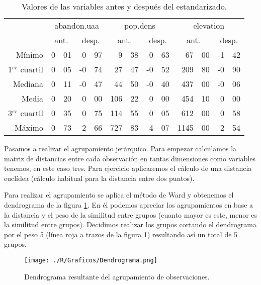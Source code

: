 \documentclass[11pt,a4paper]{article}
\begin{document}
\begin{table}[ht]
\centering
\begin{tabular}{rr@{,}lr@{,}lr@{,}lr@{,}lr@{,}lr@{,}l}
\toprule[0,4mm]
& \multicolumn{4}{c}{abandon.uaa} & \multicolumn{4}{c}{pop.dens} & \multicolumn{4}{c}{elevation}\\
& \multicolumn{2}{c}{ant.} & \multicolumn{2}{c}{desp.} & \multicolumn{2}{c}{ant.} & \multicolumn{2}{c}{desp.} & \multicolumn{2}{c}{ant.} & \multicolumn{2}{c}{desp.}\\
\midrule
Mínimo & 0&01 & -0&97 & 9&38 & -0&63 & 67&00 & -1&42\\ 
1$^{er}$ cuartil & 0&05 & -0&74 & 27&47 & -0&52 & 209&80 & -0&90\\
Mediana & 0&11 & -0&47 & 44&50 & -0&40 & 437&00 & -0&06\\
Media & 0&20 & 0&00 & 106&22 & 0&00 & 454&10 & 0&00\\
3$^{er}$ cuartil & 0&35 & 0&75 & 114&55 & 0&05 & 612&00 & 0&58\\
Máximo & 0&73 & 2&66 & 727&83 & 4&07 & 1145&00 & 2&54\\
\bottomrule[0.4mm]
\end{tabular}
\caption{Valores de las variables antes y después del estandarizado.}
\label{tab:estand}
\end{table}

Pasamos a realizar el agrupamiento jerárquico. Para empezar calculamos la matriz de distancias entre cada observación en tantas dimensiones como variables tenemos, en este caso tres. Para ejercicio aplicaremos el cálculo de una distancia euclídea (cálculo habitual para la distancia entre dos puntos).

Para realizar el agrupamiento se aplica el método de Ward y obtenemos el dendrograma de la figura \ref{fig:dendro}. En él podemos apreciar los agrupamientos en base a la distancia y el peso de la similitud entre grupos (cuanto mayor es este, menor es la similitud entre grupos). Decidimos realizar los grupos cortando el dendrograma por el peso 5 (línea roja a trazos de la figura \ref{fig:dendro}) resultando así un total de 5 grupos.

\begin{figure}
\centering
\texttt{[image: ./R/Graficos/Dendrograma.png]}
\caption{Dendrograma resultante del agrupamiento de observaciones.}
\label{fig:dendro}
\end{figure}
\end{document}
